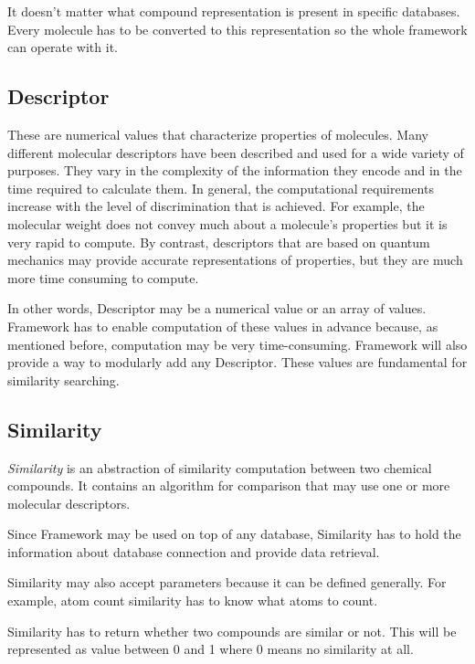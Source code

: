 \documentclass[thesis=M,english]{FITthesis}[2012/10/20]
\begin{document}
It doesn’t matter what compound representation is present in specific databases. Every molecule has to be converted to this representation so the whole framework can operate with it. 

\subsection{Descriptor}
These are numerical values that characterize properties of molecules. Many different molecular descriptors have been described and used for a wide variety of purposes. They vary in the complexity of the information they encode and in the time required to calculate them. In general, the computational requirements increase with the level of discrimination that is achieved. For example, the molecular weight does not convey much about a molecule’s properties but it is very rapid to compute. By contrast, descriptors that are based on quantum mechanics may provide accurate representations of properties, but they are much more time consuming to compute. \cite{intro}

In other words, Descriptor may be a numerical value or an array of values. Framework has to enable computation of these values in advance because, as mentioned before, computation may be very time-consuming. Framework will also provide a way to modularly add any Descriptor. These values are fundamental for similarity searching.

\subsection{Similarity}
\textit{Similarity} is an abstraction of similarity computation between two chemical compounds. It contains an algorithm for comparison that may use one or more molecular descriptors.

Since Framework may be used on top of any database, Similarity has to hold the information about database connection and provide data retrieval.

Similarity may also accept parameters because it can be defined generally. For example, atom count similarity has to know what atoms to count. 

Similarity has to return whether two compounds are similar or not. This will be represented as value between 0 and 1 where 0 means no similarity at all.
\end{document}
